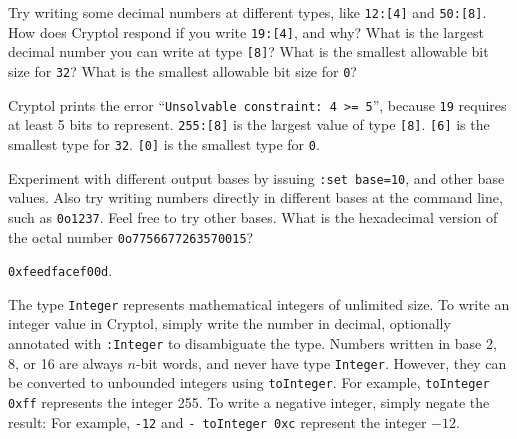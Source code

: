 \begin{Exercise}\label{ex:decimalType}
  Try writing some decimal numbers at different types, like
  \texttt{12:[4]} and \texttt{50:[8]}. How does Cryptol respond if
  you write \texttt{19:[4]}, and why? What is the largest decimal
  number you can write at type \texttt{[8]}? What is the smallest
  allowable bit size for \texttt{32}? What is the smallest allowable
  bit size for \texttt{0}?
\end{Exercise}
\begin{Answer}
  Cryptol prints the error ``\texttt{Unsolvable constraint: 4 >= 5}'',
  because \texttt{19} requires at least 5 bits to represent.
  \texttt{255:[8]} is the largest value of type \texttt{[8]}.
  \texttt{[6]} is the smallest type for \texttt{32}. \texttt{[0]} is
  the smallest type for \texttt{0}.
\end{Answer}

\begin{Exercise}\label{ex:setBase}
  Experiment with different output bases by issuing {\tt :set
    base=10}, and other base values. Also try writing numbers directly
  in different bases at the command line, such as {\tt 0o1237}.  Feel
  free to try other bases.  What is the hexadecimal version of the
  octal number {\tt 0o7756677263570015}?
\end{Exercise}
\begin{Answer}
{\tt 0xfeedfacef00d}.
\end{Answer}



The type \texttt{Integer} represents mathematical integers of
unlimited size. To write an integer value in Cryptol, simply write the
number in decimal, optionally annotated with \texttt{:Integer} to
disambiguate the type. Numbers written in base 2, 8, or 16 are always
$n$-bit words, and never have type \texttt{Integer}. However, they can
be converted to unbounded integers using \texttt{toInteger}. For
example, \texttt{toInteger 0xff} represents the integer 255. To write
a negative integer, simply negate the result: For example,
\texttt{-12} and \texttt{- toInteger 0xc} represent the integer $-12$.

